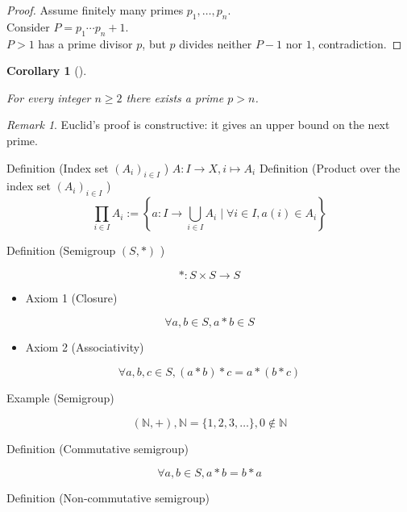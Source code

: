 \documentclass[
  letterpaper,
  DIV=11,
  numbers=noendperiod]{scrartcl}
\providecommand{\tightlist}{%
  \setlength{\itemsep}{0pt}\setlength{\parskip}{0pt}}
\theoremstyle{plain}
\theoremstyle{definition}
\theoremstyle{plain}
\theoremstyle{plain}
\newtheorem{corollary}{Corollary}[section]
\theoremstyle{remark}
\newtheorem{refremark}{Remark}[section]
\begin{document}
\begin{proof}
Assume finitely many primes \(p_1,\dots,p_n\).\\
Consider \(P=p_1\cdots p_n+1\).\\
\(P>1\) has a prime divisor \(p\), but \(p\) divides neither \(P-1\) nor
\(1\), contradiction.
\end{proof}

\begin{corollary}[]\protect\hypertarget{cor-next-prime}{}\label{cor-next-prime}

For every integer \(n\ge 2\) there exists a prime \(p>n\).

\end{corollary}

\begin{refremark}
Euclid's proof is constructive: it gives an upper bound on the next
prime.

\label{rem-euclid}

\end{refremark}

Definition (Index set \(\left(A_i\right)_{i \in I}\) )
\(A: I \rightarrow X, i \mapsto A_i\) Definition (Product over the index
set \(\left(A_i\right)_{i \in I}\) ) \[
\prod_{i \in I} A_i:=\left\{a: I \rightarrow \bigcup_{i \in I} A_i \mid \forall i \in I, a(i) \in A_i\right\}
\]

Definition (Semigroup \((S, *)\) )

\[
*: S \times S \rightarrow S
\]

\begin{itemize}
\tightlist
\item
  Axiom 1 (Closure)
\end{itemize}

\[
\forall a, b \in S, a * b \in S
\]

\begin{itemize}
\tightlist
\item
  Axiom 2 (Associativity)
\end{itemize}

\[
\forall a, b, c \in S,(a * b) * c=a *(b * c)
\]

Example (Semigroup)

\[
(\mathbb{N},+), \mathbb{N}=\{1,2,3, \ldots\}, 0 \notin \mathbb{N}
\]

Definition (Commutative semigroup)

\[
\forall a, b \in S, a * b=b * a
\]

Definition (Non-commutative semigroup)
\end{document}
